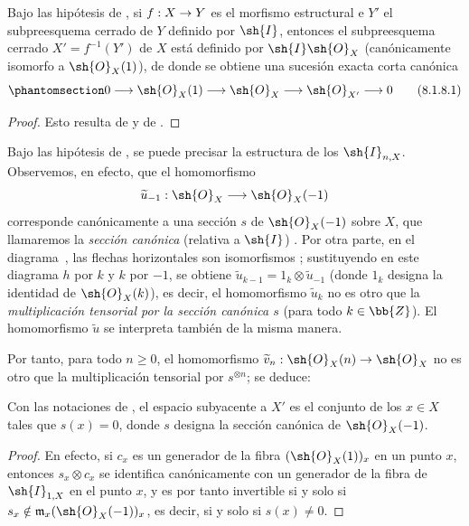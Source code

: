\documentclass[oneside,10pt]{amsart}
\makeatletter
\renewcommand{\geq}{\geqslant}
\newcommand{\ega@arrow}[2]{\mathchoice{#1}{#2}{#2}{#2}}
\renewcommand{\to}{\ega@arrow{\longrightarrow}{\rightarrow}}
\let\EGAOriginalLabel\label
\renewcommand{\label}[1]{\phantomsection\EGAOriginalLabel{#1}}
\makeatother
\begin{document}
\begin{corollary}[8.1.8]
\label{II.8.1.8}
Bajo las hipótesis de , si $f:X\to Y$ es el morfismo estructural e $Y'$ el subpreesquema cerrado de $Y$ definido por $\sh{I}$, entonces el subpreesquema cerrado $X'=f^{-1}(Y')$ de $X$ está definido por $\sh{I}\sh{O}_X$ (canónicamente isomorfo a $\sh{O}_X(1)$), de donde se obtiene una sucesión exacta corta canónica
\[
\label{II.8.1.8.1}
  0\to\sh{O}_X(1)\to\sh{O}_X\to\sh{O}_{X'}\to0
\tag{8.1.8.1}
\]
\end{corollary}

\begin{proof}
Esto resulta de  y de .
\end{proof}

\begin{env}[8.1.9]
\label{II.8.1.9}
Bajo las hipótesis de , se puede precisar la estructura de los $\sh{I}_{n,X}$.
Observemos, en efecto, que el homomorfismo
\[
  \widetilde{u}_{-1}:\sh{O}_X\to\sh{O}_X(-1)
\]
corresponde canónicamente a una sección $s$ de $\sh{O}_X(-1)$ sobre $X$, que llamaremos la \emph{sección canónica} (relativa a $\sh{I}$) .
Por otra parte, en el diagrama~, las flechas horizontales son isomorfismos ; sustituyendo en este diagrama $h$ por $k$ y $k$ por $-1$, se obtiene $\widetilde{u}_{k-1}=1_k\otimes\widetilde{u}_{-1}$ (donde $1_k$ designa la identidad de $\sh{O}_X(k)$), es decir, el homomorfismo $\widetilde{u}_k$ no es otro que la \emph{multiplicación tensorial por la sección canónica $s$} (para todo $k\in\bb{Z}$).
El homomorfismo $\widetilde{u}$  se interpreta también de la misma manera.

Por tanto, para todo $n\geq0$, el homomorfismo $\widetilde{v}_n:\sh{O}_X(n)\to\sh{O}_X$ no es otro que la multiplicación tensorial por $s^{\otimes n}$; se deduce:
\end{env}

\begin{corollary}[8.1.10]
\label{II.8.1.10}
Con las notaciones de , el espacio subyacente a $X'$ es el conjunto de los $x\in X$ tales que $s(x)=0$, donde $s$ designa la sección canónica de $\sh{O}_X(-1)$.
\end{corollary}

\begin{proof}
En efecto, si $c_x$ es un generador de la fibra $(\sh{O}_X(1))_x$ en un punto $x$, entonces $s_x\otimes c_x$ se identifica canónicamente con un generador de la fibra de $\sh{I}_{1,X}$ en el punto $x$, y es por tanto invertible si y solo si $s_x\notin\mathfrak{m}_x(\sh{O}_X(-1))_x$, es decir, si y solo si $s(x)\neq0$.
\end{proof}
\end{document}
